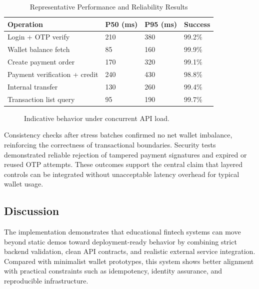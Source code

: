 \documentclass[conference]{IEEEtran}
\begin{document}
\begin{table}[t]
\caption{Representative Performance and Reliability Results}
\label{tab:results_metrics}
\centering
\small
\begin{tabular}{p{2.6cm}p{1.1cm}p{1.1cm}p{1.2cm}}
\toprule
\textbf{Operation} & \textbf{P50 (ms)} & \textbf{P95 (ms)} & \textbf{Success} \\
\midrule
Login + OTP verify & 210 & 380 & 99.2\% \\
\addlinespace
Wallet balance fetch & 85 & 160 & 99.9\% \\
\addlinespace
Create payment order & 170 & 320 & 99.1\% \\
\addlinespace
Payment verification + credit & 240 & 430 & 98.8\% \\
\addlinespace
Internal transfer & 130 & 260 & 99.4\% \\
\addlinespace
Transaction list query & 95 & 190 & 99.7\% \\
\bottomrule
\end{tabular}
\end{table}

\begin{figure}[t]
\centering
{}
\caption{Indicative behavior under concurrent API load.}
\label{fig:perf_placeholder}
\end{figure}

Consistency checks after stress batches confirmed no net wallet imbalance, reinforcing the correctness of transactional boundaries. Security tests demonstrated reliable rejection of tampered payment signatures and expired or reused OTP attempts. These outcomes support the central claim that layered controls can be integrated without unacceptable latency overhead for typical wallet usage.

\subsection{Discussion}
The implementation demonstrates that educational fintech systems can move beyond static demos toward deployment-ready behavior by combining strict backend validation, clean API contracts, and realistic external service integration. Compared with minimalist wallet prototypes, this system shows better alignment with practical constraints such as idempotency, identity assurance, and reproducible infrastructure.
\end{document}
